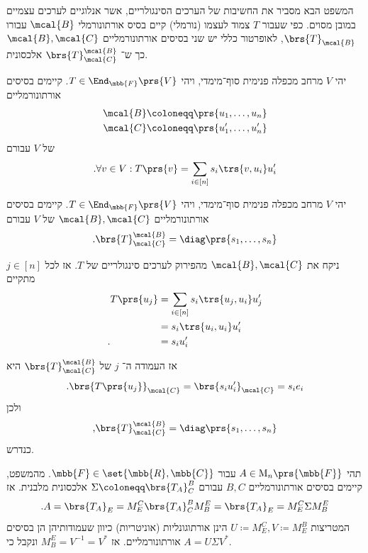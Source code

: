 \documentclass[a4paper,10pt,twoside,openany]{book}
\renewcommand{\Mat}{\mathrm{M}}
\begin{document}
המשפט הבא מסביר את החשיבות של הערכים הסינגולריים, אשר אנלוגיים לערכים עצמיים במובן מסוים. כפי שעבור
$T$
צמוד לעצמו (נורמלי) קיים בסיס אורתונורמלי
$\mcal{B}$
עבורו
$\brs{T}_{\mcal{B}}$,
לאופרטור כללי יש שני בסיסים אורתונורמליים
$\mcal{B}, \mcal{C}$
כך ש־%
$\brs{T}^{\mcal{B}}_{\mcal{C}}$
אלכסונית.

\begin{theorem}
יהי
$V$
מרחב מכפלה פנימית סוף־מימדי, ויהי
$T \in \End_{\mbb{F}}\prs{V}$.
קיימים בסיסים אורתונורמליים
\begin{align*}
\mcal{B} &\coloneqq \prs{u_1, \ldots, u_n} \\
\mcal{C} &\coloneqq \prs{u_1', \ldots, u_n'}
\end{align*}
של
$V$
עבורם
\begin{align*}
\text{.} \forall v \in V: T\prs{v} = \sum_{i \in [n]} s_i \trs{v, u_i} u_i'
\end{align*}
\end{theorem}

\begin{exercisechap}
יהי
$V$
מרחב מכפלה פנימית סוף־מימדי, ויהי
$T \in \End_{\mbb{F}}\prs{V}$.
קיימים בסיסים אורתונורמליים
$\mcal{B}, \mcal{C}$
של
$V$
עבורם
\[\text{.} \brs{T}^{\mcal{B}}_{\mcal{C}} = \diag\prs{s_1, \ldots, s_n}\]
\end{exercisechap}

\begin{solution}
ניקח את
$\mcal{B}, \mcal{C}$
מהפירוק לערכים סינגולריים של
$T$.
אז לכל
$j \in [n]$
מתקיים
\begin{align*}
T\prs{u_j} &= \sum_{i \in [n]} s_i \trs{u_j, u_i} u_j'
\\&= s_i \trs{u_i, u_i} u_i'
\\ \text{.} \hphantom{T\prs{u_j}} &= s_i u_i'
\end{align*}

אז העמודה ה־%
$j$
של
$\brs{T}^{\mcal{B}}_{\mcal{C}}$
היא
\begin{align*}
\text{.} \brs{T\prs{u_j}}_{\mcal{C}} = \brs{s_i u_i'}_{\mcal{C}} = s_i e_i
\end{align*}
ולכן
\[\text{,} \brs{T}^{\mcal{B}}_{\mcal{C}} = \diag\prs{s_1, \ldots, s_n}\]
כנדרש.
\end{solution}

\begin{corollary} \label{corollary:matrix-svd}
תהי
$A \in \Mat_{n}\prs{\mbb{F}}$
עבור
$\mbb{F} \in \set{\mbb{R}, \mbb{C}}$.
מהמשפט, קיימים בסיסים אורתונורמליים
$B,C$
עבורם
$\Sigma \coloneqq \brs{T_A}^B_C$
אלכסונית מלבנית.
אז
\[\text{.} A = \brs{T_A}_E = M^C_E \brs{T_A}^B_C M^E_B = \brs{T_A}_E = M^C_E \Sigma M^E_B\]
המטריצות
$U \coloneqq M^C_E, V \coloneqq M^B_E$
הינן אורתוגונליות (אוניטריות) כיוון שעמודותיהן הן בסיסים אורתונורמליים.
אז
$M^E_B = V^{-1} = V^*$
ונקבל כי
$A = U \Sigma V^*$.
\end{corollary}
\end{document}

